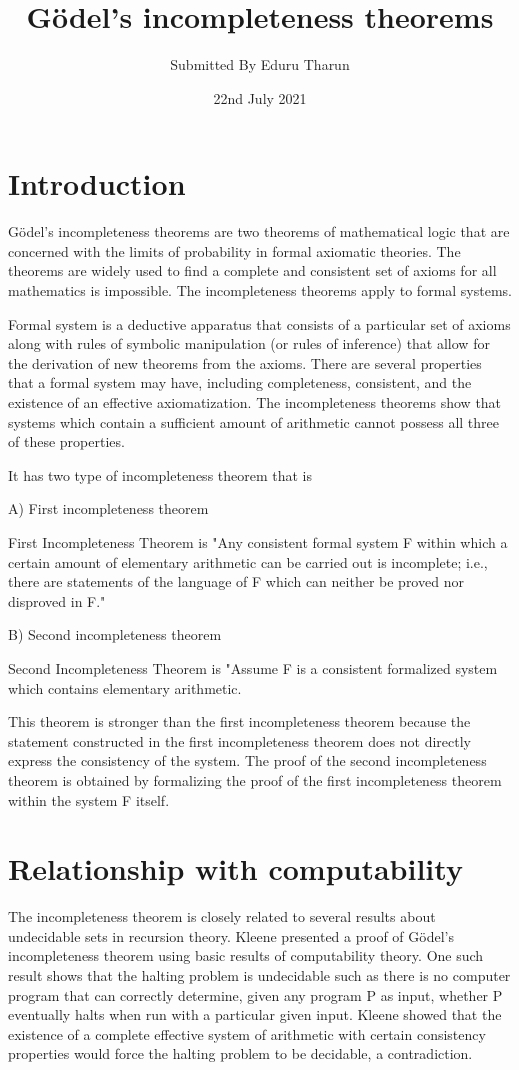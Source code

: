 \documentclass{article}
\title{Gödel's incompleteness theorems}
\author{Submitted By Eduru Tharun}
\date{22nd July 2021}
\begin{document}
\maketitle

\section{Introduction}
Gödel's incompleteness theorems are two theorems of mathematical logic that are concerned with the limits of probability in formal axiomatic theories. The theorems are widely used to find a complete and consistent set of axioms for all mathematics is impossible. The incompleteness theorems apply to formal systems.

Formal system is a deductive apparatus that consists of a particular set of axioms along with rules of symbolic manipulation (or rules of inference) that allow for the derivation of new theorems from the axioms. There are several properties that a formal system may have, including completeness, consistent, and the existence of an effective axiomatization. The incompleteness theorems show that systems which contain a sufficient amount of arithmetic cannot possess all three of these properties.

It has two type of incompleteness theorem that is

A) First incompleteness theorem

First Incompleteness Theorem is "Any consistent formal system F within which a certain amount of elementary arithmetic can be carried out is incomplete; i.e., there are statements of the language of F which can neither be proved nor disproved in F." 

B) Second incompleteness theorem 

Second Incompleteness Theorem is "Assume F is a consistent formalized system which contains elementary arithmetic.

This theorem is stronger than the first incompleteness theorem because the statement constructed in the first incompleteness theorem does not directly express the consistency of the system. The proof of the second incompleteness theorem is obtained by formalizing the proof of the first incompleteness theorem within the system F itself.

\section{Relationship with computability}
The incompleteness theorem is closely related to several results about undecidable sets in recursion theory. Kleene presented a proof of Gödel's incompleteness theorem using basic results of computability theory. One such result shows that the halting problem is undecidable such as there is no computer program that can correctly determine, given any program P as input, whether P eventually halts when run with a particular given input. Kleene showed that the existence of a complete effective system of arithmetic with certain consistency properties would force the halting problem to be decidable, a contradiction.
\end{document}

